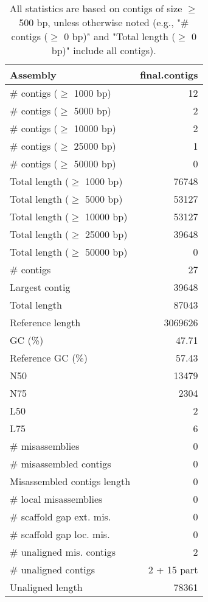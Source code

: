 \documentclass[12pt,a4paper]{article}
\begin{document}
\begin{table}[ht]
\begin{center}
\caption{All statistics are based on contigs of size $\geq$ 500 bp, unless otherwise noted (e.g., "\# contigs ($\geq$ 0 bp)" and "Total length ($\geq$ 0 bp)" include all contigs).}
\begin{tabular}{|l*{1}{|r}|}
\hline
Assembly & final.contigs \\ \hline
\# contigs ($\geq$ 1000 bp) & 12 \\ \hline
\# contigs ($\geq$ 5000 bp) & 2 \\ \hline
\# contigs ($\geq$ 10000 bp) & 2 \\ \hline
\# contigs ($\geq$ 25000 bp) & 1 \\ \hline
\# contigs ($\geq$ 50000 bp) & 0 \\ \hline
Total length ($\geq$ 1000 bp) & 76748 \\ \hline
Total length ($\geq$ 5000 bp) & 53127 \\ \hline
Total length ($\geq$ 10000 bp) & 53127 \\ \hline
Total length ($\geq$ 25000 bp) & 39648 \\ \hline
Total length ($\geq$ 50000 bp) & 0 \\ \hline
\# contigs & 27 \\ \hline
Largest contig & 39648 \\ \hline
Total length & 87043 \\ \hline
Reference length & 3069626 \\ \hline
GC (\%) & 47.71 \\ \hline
Reference GC (\%) & 57.43 \\ \hline
N50 & 13479 \\ \hline
N75 & 2304 \\ \hline
L50 & 2 \\ \hline
L75 & 6 \\ \hline
\# misassemblies & 0 \\ \hline
\# misassembled contigs & 0 \\ \hline
Misassembled contigs length & 0 \\ \hline
\# local misassemblies & 0 \\ \hline
\# scaffold gap ext. mis. & 0 \\ \hline
\# scaffold gap loc. mis. & 0 \\ \hline
\# unaligned mis. contigs & 2 \\ \hline
\# unaligned contigs & 2 + 15 part \\ \hline
Unaligned length & 78361 \\ \hline

\end{tabular}
\end{center}
\end{table}
\end{document}
